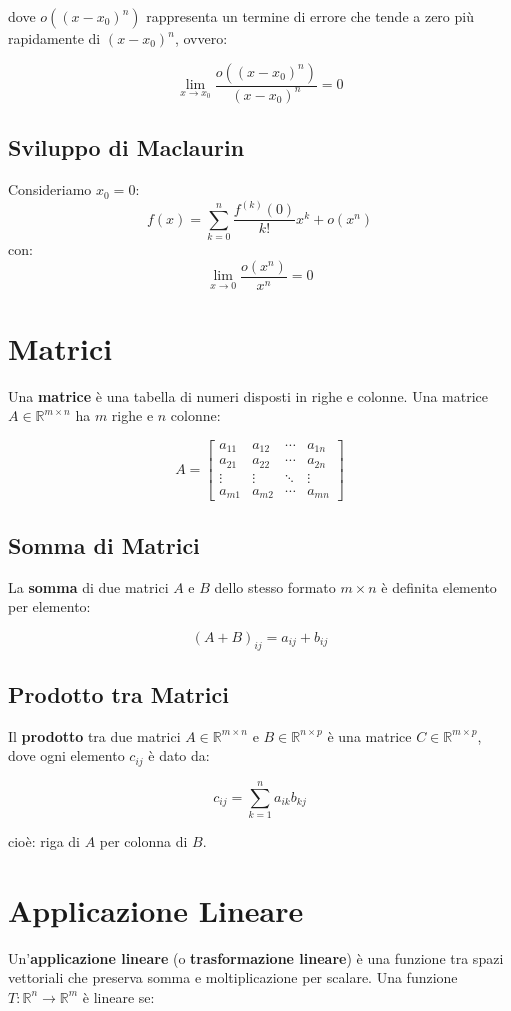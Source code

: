\documentclass{article}
\begin{document}
dove \( o((x - x_0)^n) \) rappresenta un termine di errore che tende a zero più rapidamente di \( (x - x_0)^n \), ovvero:

\[
\lim_{x \to x_0} \frac{o((x - x_0)^n)}{(x - x_0)^n} = 0
\]

\subsection*{Sviluppo di Maclaurin}
Consideriamo \( x_0 = 0 \):
\[
f(x) = \sum_{k=0}^{n} \frac{f^{(k)}(0)}{k!}x^k + o(x^n)
\]
con:
\[
\lim_{x \to 0} \frac{o(x^n)}{x^n} = 0
\]

\section{Matrici}
Una \textbf{matrice} è una tabella di numeri disposti in righe e colonne. Una matrice \( A \in \mathbb{R}^{m \times n} \) ha \( m \) righe e \( n \) colonne:

\[
A = 
\begin{bmatrix}
a_{11} & a_{12} & \cdots & a_{1n} \\
a_{21} & a_{22} & \cdots & a_{2n} \\
\vdots & \vdots & \ddots & \vdots \\
a_{m1} & a_{m2} & \cdots & a_{mn}
\end{bmatrix}
\]

\subsection*{Somma di Matrici}
La \textbf{somma} di due matrici \( A \) e \( B \) dello stesso formato \( m \times n \) è definita elemento per elemento:

\[
(A + B)_{ij} = a_{ij} + b_{ij}
\]

\subsection*{Prodotto tra Matrici}
Il \textbf{prodotto} tra due matrici \( A \in \mathbb{R}^{m \times n} \) e \( B \in \mathbb{R}^{n \times p} \) è una matrice \( C \in \mathbb{R}^{m \times p} \), dove ogni elemento \( c_{ij} \) è dato da:

\[
c_{ij} = \sum_{k=1}^{n} a_{ik} b_{kj}
\]

cioè: riga di \( A \) per colonna di \( B \).

\section{Applicazione Lineare}
Un'\textbf{applicazione lineare} (o \textbf{trasformazione lineare}) è una funzione tra spazi vettoriali che preserva somma e moltiplicazione per scalare. Una funzione \( T: \mathbb{R}^n \to \mathbb{R}^m \) è lineare se:
\end{document}
